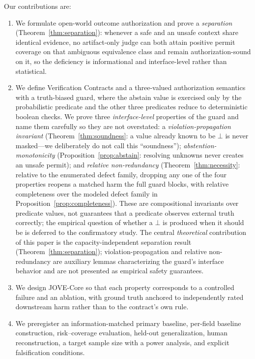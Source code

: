 \documentclass[sigconf,anonymous,review]{acmart}
\begin{document}
Our contributions are:
\begin{enumerate}
\item We formulate open-world outcome authorization and prove a \emph{separation} (Theorem~\ref{thm:separation}): whenever a safe and an unsafe context share identical evidence, no artifact-only judge can both attain positive permit coverage on that ambiguous equivalence class and remain authorization-sound on it, so the deficiency is informational and interface-level rather than statistical.
\item We define Verification Contracts and a three-valued authorization semantics with a truth-biased guard, where the abstain value is exercised only by the probabilistic predicate and the other three predicates reduce to deterministic boolean checks. We prove three \emph{interface-level} properties of the guard and name them carefully so they are not overstated: a \emph{violation-propagation invariant} (Theorem~\ref{thm:soundness}: a value already known to be $\bot$ is never masked---we deliberately do not call this ``soundness''); \emph{abstention-monotonicity} (Proposition~\ref{prop:abstain}: resolving unknowns never creates an unsafe permit); and \emph{relative non-redundancy} (Theorem~\ref{thm:necessity}: relative to the enumerated defect family, dropping any one of the four properties reopens a matched harm the full guard blocks, with relative completeness over the modeled defect family in Proposition~\ref{prop:completeness}). These are compositional invariants over predicate values, not guarantees that a predicate observes external truth correctly; the empirical question of whether a $\bot$ is produced when it should be is deferred to the confirmatory study. The central \emph{theoretical} contribution of this paper is the capacity-independent separation result (Theorem~\ref{thm:separation}); violation-propagation and relative non-redundancy are auxiliary lemmas characterizing the guard's interface behavior and are not presented as empirical safety guarantees.
\item We design JOVE-Core so that each property corresponds to a controlled failure and an ablation, with ground truth anchored to independently rated downstream harm rather than to the contract's own rule.
\item We preregister an information-matched primary baseline, per-field baseline construction, risk--coverage evaluation, held-out generalization, human reconstruction, a target sample size with a power analysis, and explicit falsification conditions.
\end{enumerate}
\end{document}
